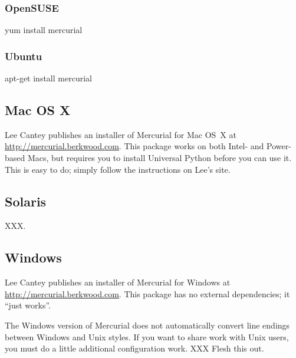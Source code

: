 \subsubsection{OpenSUSE}

\begin{codesample2}
  yum install mercurial
\end{codesample2}

\subsubsection{Ubuntu}

\begin{codesample2}
  apt-get install mercurial
\end{codesample2}

\subsection{Mac OS X}

Lee Cantey publishes an installer of Mercurial for Mac OS~X at
\url{http://mercurial.berkwood.com}.  This package works on both
Intel- and Power-based Macs, but requires you to install Universal
Python before you can use it.  This is easy to do; simply follow the
instructions on Lee's site.

\subsection{Solaris}

XXX.

\subsection{Windows}

Lee Cantey publishes an installer of Mercurial for Windows at
\url{http://mercurial.berkwood.com}.  This package has no external
dependencies; it ``just works''.

\begin{note}
  The Windows version of Mercurial does not automatically convert line
  endings between Windows and Unix styles.  If you want to share work
  with Unix users, you must do a little additional configuration
  work. XXX Flesh this out.
\end{note}

